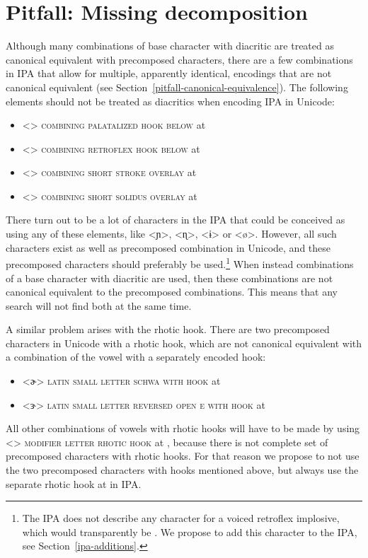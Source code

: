 \section{Pitfall: Missing decomposition}
\label{pitfall-missing-decomposition}

Although many combinations of base character with diacritic are treated as
canonical equivalent with precomposed characters, there are a few combinations
in IPA that allow for multiple, apparently identical, encodings that are not
canonical equivalent (see Section~\ref{pitfall-canonical-equivalence}). The
following elements should not be treated as diacritics when encoding IPA in
Unicode: 
\begin{itemize}
  \item[] <{}> \textsc{combining palatalized hook below} at 
  \item[] <{}> \textsc{combining retroflex hook below} at 
  \item[] <> \textsc{combining short stroke overlay} at 
  \item[] <> \textsc{combining short solidus overlay} at 
\end{itemize} 

There turn out to be a lot of characters in the IPA that could be conceived as
using any of these elements, like <ɲ>, <ɳ>, <ɨ> or <ø>. However, all such
characters exist as well as precomposed combination in Unicode, and these
precomposed characters should preferably be used.\footnote{The IPA does not
describe any character for a voiced retroflex implosive, which would
transparently be . We propose to add this character to the IPA, see
Section~\ref{ipa-additions}.} When instead combinations of a base character with
diacritic are used, then these combinations are not canonical equivalent to the
precomposed combinations. This means that any search will not find both at the
same time.

A similar problem arises with the rhotic hook. There are two precomposed
characters in Unicode with a rhotic hook, which are not canonical equivalent 
with a combination of the vowel with a separately encoded hook:
\begin{itemize}
  \item[] <ɚ> \textsc{latin small letter schwa with hook} at 
  \item[] <ɝ> \textsc{latin small letter reversed open e with hook} at 
\end{itemize}
All other combinations of vowels with rhotic hooks will have to be made by using
<> \textsc{modifier letter rhotic hook} at , because there
is not complete set of precomposed characters with rhotic hooks. For that reason
we propose to not use the two precomposed characters with hooks mentioned above,
but always use the separate rhotic hook at  in IPA.\@

